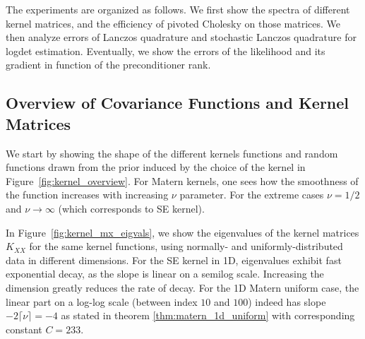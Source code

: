 \documentclass{article}
\begin{document}
The experiments are organized as follows. We first show the spectra of different kernel matrices, and the efficiency of pivoted Cholesky on those matrices. We then analyze errors of Lanczos quadrature and stochastic Lanczos quadrature for logdet estimation. Eventually, we show the errors of the likelihood and its gradient in function of the preconditioner rank. 


\subsection{Overview of Covariance Functions and Kernel Matrices}

We start by showing the shape of the different kernels functions and random functions drawn from the prior induced by the choice of the kernel in Figure~\ref{fig:kernel_overview}. For Matern kernels, one sees how the smoothness of the function increases with increasing $\nu$ parameter. For the extreme cases $\nu = 1/2$ and $\nu \to \infty$ (which corresponds to SE kernel).%

In Figure~\ref{fig:kernel_mx_eigvals}, we show the eigenvalues of the kernel matrices $K_{XX}$ for the same kernel functions, using normally- and uniformly-distributed data in different dimensions. For the SE kernel in 1D, eigenvalues exhibit fast exponential decay, as the slope is linear on a semilog scale. Increasing the dimension greatly reduces the rate of decay. For the 1D Matern uniform case, the linear part on a log-log scale (between index $10$ and $100$) indeed has slope $-2\lceil \nu \rceil = -4$ as stated in theorem \ref{thm:matern_1d_uniform} with corresponding constant $C=233$. 
\end{document}
